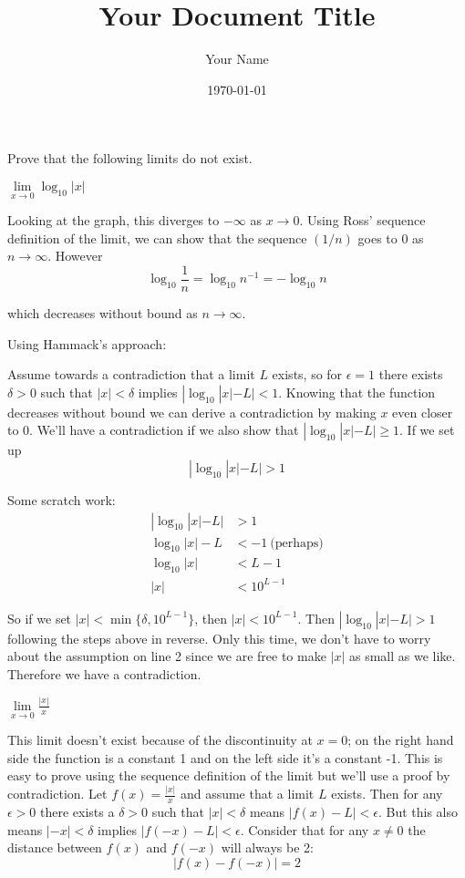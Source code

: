 \documentclass{article}
\title{Your Document Title}
\author{Your Name}
\date{\today} %
\begin{document}
\maketitle
Prove that the following limits do not exist.
\begin{problem}
$\lim\limits_{x \to 0} \log_{10} |x|$
\end{problem}
Looking at the graph, this diverges to $-\infty$ as $x \to 0$. Using Ross' sequence definition of the limit, we can show that the sequence $(1/n)$ goes to 0 as $n \to \infty$. However
$$\log_{10} \frac{1}{n} = \log_{10} n^{-1} = - \log_{10} n$$

which decreases without bound as $n \to \infty$.


Using Hammack's approach:

Assume towards a contradiction that a limit $L$ exists, so for $\epsilon = 1$ there exists $\delta > 0$ such that $|x| < \delta$ implies $|\log_{10} |x| - L | < 1$. Knowing that the function decreases without bound we can derive a contradiction by making $x$ even closer to 0. We'll have a contradiction if we also show that $|\log_{10}|x| - L | \geq 1$. If we set up
$$|\log_{10} |x| - L | > 1$$

Some scratch work:
\begin{align*}
  |\log_{10} |x| - L | & > 1                     \\
  \log_{10} |x| - L    & < -1 \ \text{(perhaps)} \\
  \log_{10} |x|        & < L - 1                 \\
  |x|                  & < 10^{L - 1}
\end{align*}

So if we set $|x| < \min\{\delta, 10^{L -1 }\}$, then $|x| < 10^{L - 1}$. Then $|\log_{10} |x| - L| > 1$ following the steps above in reverse. Only this time, we don't have to worry about the assumption on line 2 since we are free to make $|x|$ as small as we like. Therefore we have a contradiction.

\begin{problem}
$\lim\limits_{x \to 0} \frac{|x|}{x}$
\end{problem}

This limit doesn't exist because of the discontinuity at $x = 0$; on the right hand side the function is a constant 1 and on the left side it's a constant -1. This is easy to prove using the sequence definition of the limit but we'll use a proof by contradiction. Let $f(x) = \frac{|x|}{x}$ and assume that a limit $L$ exists. Then for any $\epsilon > 0$ there exists a $\delta > 0$ such that $|x| < \delta$ means $|f(x) - L| < \epsilon$. But this also means $|-x| < \delta$ implies $|f(-x) - L| < \epsilon$. Consider that for any $x \neq 0$ the distance between $f(x)$ and $f(-x)$ will always be 2:
$$|f(x) - f(-x)| = 2$$
\end{document}
